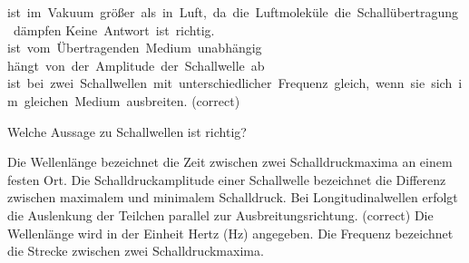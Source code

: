 \documentclass[11pt]{exam}
\begin{document}
\begin{questions}
\begin{choices}
	\choice ist im Vakuum größer als in Luft, da die Luftmoleküle die Schallübertragung dämpfen
	\choice Keine Antwort ist richtig.
	\choice ist vom Übertragenden Medium unabhängig
	\choice hängt von der Amplitude der Schallwelle ab
	\choice ist bei zwei Schallwellen mit unterschiedlicher Frequenz gleich, wenn sie sich im gleichen Medium ausbreiten. (correct)
\end{choices}

\vspace{3mm}\question Welche Aussage zu Schallwellen ist richtig?

\begin{choices}
	\choice Die Wellenlänge bezeichnet die Zeit zwischen zwei Schalldruckmaxima an einem festen Ort.
	\choice Die Schalldruckamplitude einer Schallwelle bezeichnet die Differenz zwischen maximalem und minimalem Schalldruck.
	\choice Bei Longitudinalwellen erfolgt die Auslenkung der Teilchen parallel zur Ausbreitungsrichtung. (correct)
	\choice Die Wellenlänge wird in der Einheit Hertz (Hz) angegeben.
	\choice Die Frequenz bezeichnet die Strecke zwischen zwei Schalldruckmaxima.
\end{choices}

\vspace{3mm}\end{questions}
\end{document}
